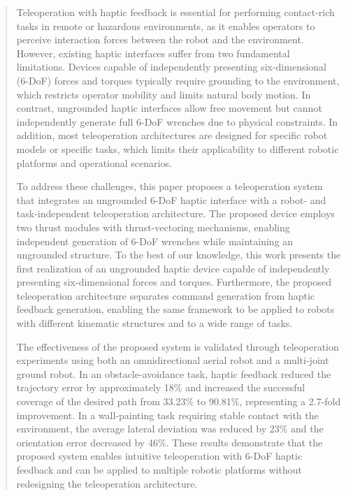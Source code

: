 \documentclass{WileyMSP-template}
\begin{document}
\begin{abstract}
  Teleoperation with haptic feedback is essential for performing contact-rich tasks in remote or hazardous environments, as it enables operators to perceive interaction forces between the robot and the environment. 
  However, existing haptic interfaces suffer from two fundamental limitations. 
  Devices capable of independently presenting six-dimensional (6-DoF) forces and torques typically require grounding to the environment, which restricts operator mobility and limits natural body motion. 
  In contrast, ungrounded haptic interfaces allow free movement but cannot independently generate full 6-DoF wrenches due to physical constraints. 
  In addition, most teleoperation architectures are designed for specific robot models or specific tasks, which limits their applicability to different robotic platforms and operational scenarios.

  To address these challenges, this paper proposes a teleoperation system that integrates an ungrounded 6-DoF haptic interface with a robot- and task-independent teleoperation architecture. 
  The proposed device employs two thrust modules with thrust-vectoring mechanisms, enabling independent generation of 6-DoF wrenches while maintaining an ungrounded structure. 
  To the best of our knowledge, this work presents the first realization of an ungrounded haptic device capable of independently presenting six-dimensional forces and torques. 
  Furthermore, the proposed teleoperation architecture separates command generation from haptic feedback generation, enabling the same framework to be applied to robots with different kinematic structures and to a wide range of tasks.
  
  The effectiveness of the proposed system is validated through teleoperation experiments using both an omnidirectional aerial robot and a multi-joint ground robot. 
  In an obstacle-avoidance task, haptic feedback reduced the trajectory error by approximately 18\% and increased the successful coverage of the desired path from 33.23\% to 90.81\%, representing a 2.7-fold improvement. 
  In a wall-painting task requiring stable contact with the environment, the average lateral deviation was reduced by 23\% and the orientation error decreased by 46\%. 
  These results demonstrate that the proposed system enables intuitive teleoperation with 6-DoF haptic feedback and can be applied to multiple robotic platforms without redesigning the teleoperation architecture.  
\end{abstract}
\end{document}
